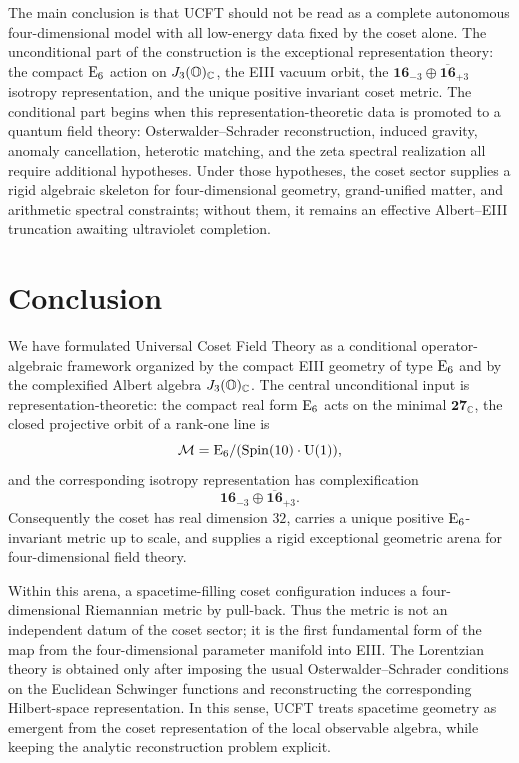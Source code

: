 \documentclass[pdflatex,sn-mathphys-num]{sn-jnl}
\theoremstyle{thmstyleone}
\theoremstyle{thmstylethree}%
\theoremstyle{thmstyletwo}%
\begin{document}
The main conclusion is that UCFT should not be read as a complete autonomous
four-dimensional model with all low-energy data fixed by the coset alone. The
unconditional part of the construction is the exceptional representation theory:
the compact \(\mathrm{E}_{6}\) action on \(J_3(\mathbb{O})_{\mathbb C}\), the EIII vacuum orbit, the
\(\mathbf{16}_{-3}\oplus\overline{\mathbf{16}}_{+3}\) isotropy representation,
and the unique positive invariant coset metric. The conditional part begins
when this representation-theoretic data is promoted to a quantum field theory:
Osterwalder--Schrader reconstruction, induced gravity, anomaly cancellation,
heterotic matching, and the zeta spectral realization all require additional
hypotheses. Under those hypotheses, the coset sector supplies a rigid algebraic
skeleton for four-dimensional geometry, grand-unified matter, and arithmetic
spectral constraints; without them, it remains an effective Albert--EIII
truncation awaiting ultraviolet completion.

\section{Conclusion}
\label{sec:Conclusion}

We have formulated Universal Coset Field Theory as a conditional
operator-algebraic framework organized by the compact EIII geometry of type
\(\mathrm{E}_{6}\) and by the complexified Albert algebra \(J_3(\mathbb{O})_{\mathbb C}\). The central
unconditional input is representation-theoretic: the compact real form
\(\mathrm{E}_{6}\) acts on the minimal \(\mathbf{27}_{\mathbb C}\), the closed
projective orbit of a rank-one line is
\[
  \mathcal{M}=\mathrm{E}_{6}/(\operatorname{Spin}(10)\cdot\mathrm{U(1)}),
\]
and the corresponding isotropy representation has complexification
\[
  \mathbf{16}_{-3}\oplus\overline{\mathbf{16}}_{+3}.
\]
Consequently the coset has real dimension \(32\), carries a unique positive
\(\mathrm{E}_{6}\)-invariant metric up to scale, and supplies a rigid exceptional
geometric arena for four-dimensional field theory.

Within this arena, a spacetime-filling coset configuration induces a
four-dimensional Riemannian metric by pull-back. Thus the metric is not an
independent datum of the coset sector; it is the first fundamental form of the
map from the four-dimensional parameter manifold into EIII. The Lorentzian
theory is obtained only after imposing the usual Osterwalder--Schrader
conditions on the Euclidean Schwinger functions and reconstructing the
corresponding Hilbert-space representation. In this sense, UCFT treats
spacetime geometry as emergent from the coset representation of the local
observable algebra, while keeping the analytic reconstruction problem explicit.
\end{document}
